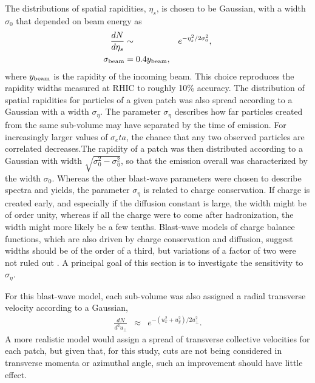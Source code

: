 The distributions of spatial rapidities, $\eta_s$, is chosen to be Gaussian, with a width $\sigma_0$ that depended on beam energy as
\begin{eqnarray}
\frac{dN}{d\eta_s}&\sim& e^{-\eta_s^2/2\sigma_0^2},\\
\nonumber
\sigma_{\rm beam}&=0.4y_{\rm beam},
\end{eqnarray}
where $y_{\rm beam}$ is the rapidity of the incoming beam. This choice reproduces the rapidity widths measured at RHIC to roughly 10\% accuracy. The distribution of spatial rapidities for particles of a given patch was also spread according to a Gaussian with a width $\sigma_\eta$. The parameter $\sigma_\eta$ describes how far particles created from the same sub-volume may have separated by the time of emission. For increasingly larger values of $\sigma_eta$, the chance that any two observed particles are correlated decreases.The rapidity of a patch was then distributed according to a Gaussian with width $\sqrt{\sigma_0^2-\sigma_\eta^2}$, so that the emission overall was characterized by the width $\sigma_0$. Whereas the other blast-wave parameters were chosen to describe spectra and yields, the parameter $\sigma_\eta$ is related to charge conservation. If charge is created early, and especially if the diffusion constant is large, the width might be of order unity, whereas if all the charge were to come after hadronization, the width might more likely be a few tenths. Blast-wave models of charge balance functions, which are also driven by charge conservation and diffusion, suggest widths should be of the order of a third, but variations of a factor of two were not ruled out \cite{Schlichting:2010qia}. A principal goal of this section is to investigate the sensitivity to $\sigma_\eta$.

For this blast-wave model, each sub-volume was also assigned a radial transverse velocity according to a Gaussian,
\begin{eqnarray}
\frac{dN}{d^2u_\perp}&\approx&e^{-(u_x^2+u_y^2)/2u_\perp^2}.
\end{eqnarray}
A more realistic model would assign a spread of transverse collective velocities for each patch, but given that, for this study, cuts are not being considered in transverse momenta or azimuthal angle, such an improvement should have little effect. 


